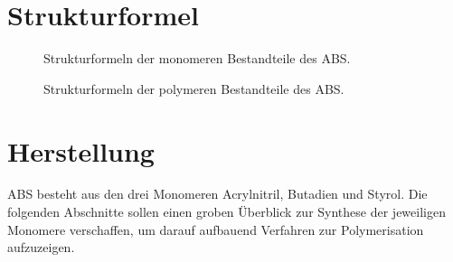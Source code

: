     \section{Strukturformel}
        \begin{figure}[H]%
            \centering
            \qquad
            \qquad
            \caption[Strukturformeln der monomeren Bestandteile des ABS]{Strukturformeln der monomeren Bestandteile des ABS.}%
            \label{fig:strukturformeln monomere}%
        \end{figure}
        \begin{figure}[H]%
            \centering
            \qquad
            \qquad
            \caption[Strukturformeln der polymeren Bestandteile des ABS]{Strukturformeln der polymeren Bestandteile des ABS.}%
            \label{fig:strukturformeln polymere}%
        \end{figure}
    \section{Herstellung}
        ABS besteht aus den drei Monomeren Acrylnitril, Butadien und Styrol. Die folgenden Abschnitte sollen einen groben
        Überblick zur Synthese der jeweiligen Monomere verschaffen, um darauf aufbauend Verfahren zur Polymerisation aufzuzeigen.
